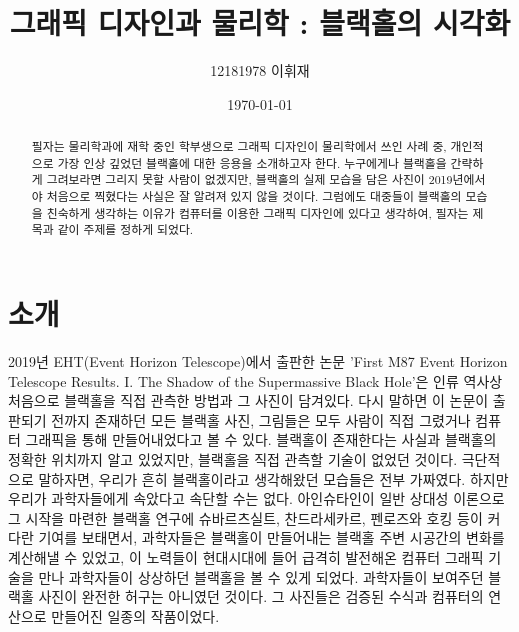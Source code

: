 \documentclass[
    aps,
    reprint,
    superscriptaddress,
    ]{revtex4-2}
\begin{document}
\title{그래픽 디자인과 물리학 : 블랙홀의 시각화}

\author{12181978 이휘재}

\date{\today}


\begin{abstract}
필자는 물리학과에 재학 중인 학부생으로 그래픽 디자인이 물리학에서 쓰인 사례 중, 개인적으로 가장
인상 깊었던 블랙홀에 대한 응용을 소개하고자 한다. 누구에게나 블랙홀을 간략하게 그려보라면
그리지 못할 사람이 없겠지만, 블랙홀의 실제 모습을 담은 사진이 2019년에서야 처음으로 찍혔다는 
사실은 잘 알려져 있지 않을 것이다. 그럼에도 대중들이 블랙홀의 모습을 친숙하게 생각하는 
이유가 컴퓨터를 이용한 그래픽 디자인에 있다고 생각하여, 필자는 제목과 같이 주제를 정하게 되었다.  
\end{abstract}

\maketitle

\section[Introduction]{소개}
2019년 EHT(Event Horizon Telescope)에서 출판한 논문 'First M87 Event Horizon Telescope Results. I.
The Shadow of the Supermassive Black Hole'은 인류 역사상 처음으로 블랙홀을 직접 관측한 방법과
그 사진이 담겨있다. 다시 말하면 이 논문이 출판되기 전까지 존재하던 모든 블랙홀 사진, 그림들은
모두 사람이 직접 그렸거나 컴퓨터 그래픽을 통해 만들어내었다고 볼 수 있다. 블랙홀이 존재한다는 사실과
블랙홀의 정확한 위치까지 알고 있었지만, 블랙홀을 직접 관측할 기술이 없었던 것이다. 극단적으로 말하자면, 
우리가 흔히 블랙홀이라고 생각해왔던 모습들은 전부 가짜였다. 하지만 우리가 과학자들에게 속았다고
속단할 수는 없다. 
아인슈타인이 일반 상대성 이론으로 그 시작을 마련한 블랙홀 연구에 슈바르츠실트, 찬드라세카르, 
펜로즈와 호킹 등이 커다란 기여를 보태면서, 과학자들은 블랙홀이 만들어내는 블랙홀 주변 시공간의 
변화를 계산해낼 수 있었고, 이 노력들이 현대시대에 들어 급격히 발전해온 컴퓨터 그래픽 기술을
만나 과학자들이 상상하던 블랙홀을 볼 수 있게 되었다. 과학자들이 보여주던 블랙홀 사진이 완전한 허구는 
아니였던 것이다. 그 사진들은 검증된 수식과 컴퓨터의 연산으로 만들어진 일종의 작품이었다.
\end{document}
